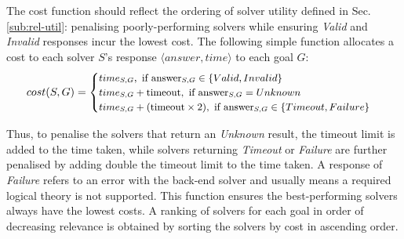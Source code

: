 The cost function should reflect the ordering of solver utility defined in Sec. \ref{sub:rel-util}: penalising poorly-performing solvers while ensuring \textit{Valid} and \textit{Invalid} responses incur the lowest cost.
The following simple function allocates a cost to each solver $S$'s response $\langle answer, time\rangle$ to each goal $G$:
\begin{equation}
\label{eq:chosen-cost}
\small
cost(S,G) = 
\begin{cases}
time_{S,G}, \text{ if answer}_{S,G} \in \lbrace Valid, Invalid \rbrace \\
time_{S,G} + \text{timeout}, \text{ if answer}_{S,G} = Unknown \\
time_{S,G} + (\text{timeout} \times 2), \text{ if answer}_{S,G} \in \lbrace Timeout, Failure \rbrace
\end{cases}
\end{equation}



Thus, to penalise the solvers that return an \textit{Unknown} result, the timeout limit is added to the time taken, while solvers returning \textit{Timeout} or \textit{Failure} are further penalised by 
adding double the timeout limit to the time taken.
A response of \textit{Failure} refers to an error with the back-end solver and usually means a required logical theory is not supported. 
This function ensures the best-performing solvers always have the lowest costs. A ranking of solvers for each goal in order of decreasing relevance is obtained by sorting the solvers by cost in ascending order.

